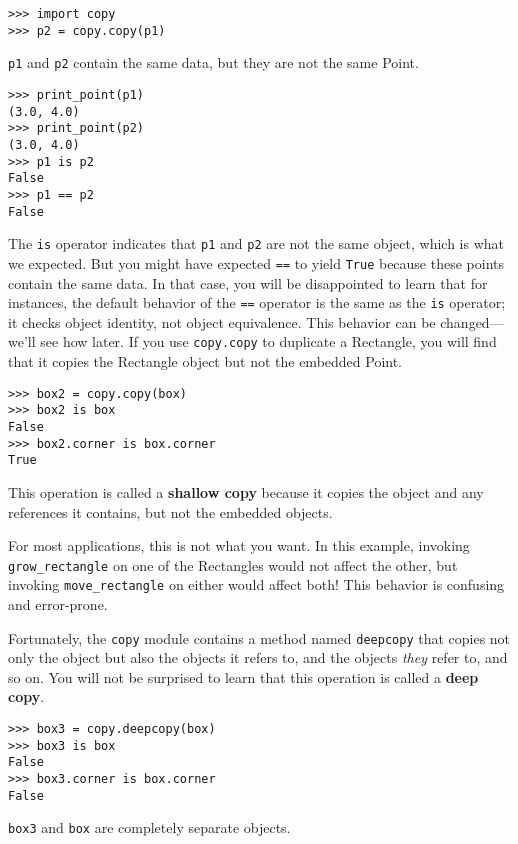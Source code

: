 \documentclass{article}
\begin{document}
\begin{multicols}{2}
\begin{verbatim}
>>> import copy
>>> p2 = copy.copy(p1)
\end{verbatim}
\verb|p1| and \verb|p2| contain the same data, but they are not the same
Point.
\begin{verbatim}
>>> print_point(p1)
(3.0, 4.0)
>>> print_point(p2)
(3.0, 4.0)
>>> p1 is p2
False
>>> p1 == p2
False
\end{verbatim}
The \verb|is| operator indicates that \verb|p1| and \verb|p2| are not the
same object, which is what we expected. But you might have expected
\verb|==| to yield \verb|True| because these points contain the same data.
In that case, you will be disappointed to learn that for instances, the
default behavior of the \verb|==| operator is the same as the \verb|is|
operator; it checks object identity, not object equivalence.  This behavior
can be changed—we’ll see how later.  If you use \verb|copy.copy| to
duplicate a Rectangle, you will find that it copies the Rectangle object
but not the embedded Point.
\begin{verbatim}
>>> box2 = copy.copy(box)
>>> box2 is box
False
>>> box2.corner is box.corner
True
\end{verbatim}
This operation is called a \textbf{shallow copy} because it copies the object
and any references it contains, but not the embedded objects.

For most applications, this is not what you want. In this example, invoking
\verb|grow_rectangle| on one of the Rectangles would not affect the other,
but invoking \verb|move_rectangle| on either would affect both! This
behavior is confusing and error-prone.

Fortunately, the \verb|copy| module contains a method named \verb|deepcopy| that copies
not only the object but also the objects it refers to, and the objects
\emph{they}
refer to, and so on. You will not be surprised to learn that this operation
is called a \textbf{deep copy}.
\begin{verbatim}
>>> box3 = copy.deepcopy(box)
>>> box3 is box
False
>>> box3.corner is box.corner
False
\end{verbatim}
\verb|box3| and \verb|box| are completely separate objects.


\end{multicols}
\end{document}
